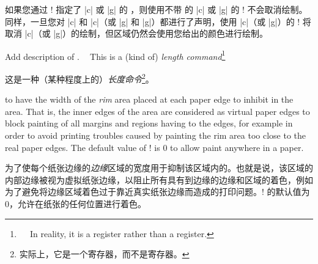 \begin{description}
\begin{itemize}
如果您通过 \!\backgroundcolor! 指定了 |c| 或 |g| 的 \bgpaint{}，则使用不带  的 |c| 或 |g| 的 \!\nobackgroundcolor! 不会取消绘制。同样，一旦您对 |c| 和 |c|（或 |g| 和 |g|）都进行了声明，使用 |c|（或 |g|）的 \!\nobackgroundcolor! 将取消 |c|（或 |g|）的绘制，但区域仍然会使用您给出的颜色进行绘制。
\end{itemize}



\item[\Midx{\!\pagerim!}]\mbox{}\par
{}
{Add description of .}

This is a (kind of) \emph{length command}\footnote{

In reality, it is a  register rather than a  register.}

这是一种（某种程度上的）\emph{长度命令}\footnote{实际上，它是一个寄存器，而不是寄存器。}。

to have the width of the \emph{rim} area placed at each paper edge to 
inhibit \bgpaint{} in the area.  That is, the inner edges of the area are
considered as virtual paper edges to block painting of all margins and
regions having \bginfext{} to the edges, for example in order to
avoid printing troubles caused by painting the rim area too close to the
real paper edges.  The default value of \!\pagerim! is 0 to allow paint
anywhere in a paper.

为了使每个纸张边缘的\emph{边缘}区域的宽度用于抑制该区域内的\bgpaint{}。也就是说，该区域的内部边缘被视为虚拟纸张边缘，以阻止所有具有\bginfext{}到边缘的边缘和区域的着色，例如为了避免将边缘区域着色过于靠近真实纸张边缘而造成的打印问题。\!\pagerim! 的默认值为 0，允许在纸张的任何位置进行着色。
\end{description}
